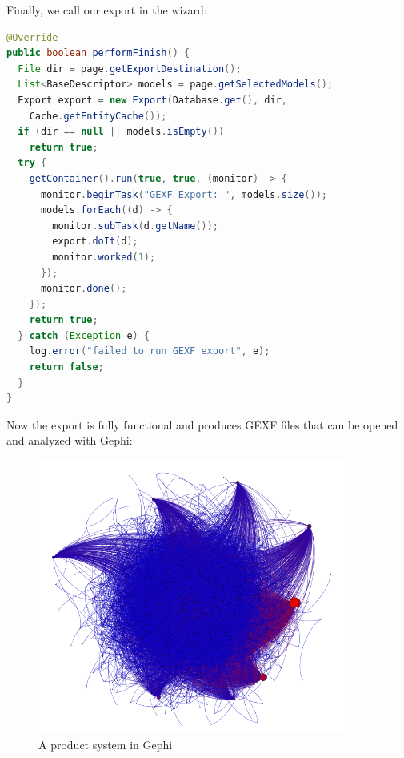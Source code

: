 \documentclass{scrreprt}
\begin{document}
Finally, we call our export in the wizard:

\begin{lstlisting}[language=Java]
@Override
public boolean performFinish() {
  File dir = page.getExportDestination();
  List<BaseDescriptor> models = page.getSelectedModels();
  Export export = new Export(Database.get(), dir,
    Cache.getEntityCache());
  if (dir == null || models.isEmpty())
    return true;
  try {
    getContainer().run(true, true, (monitor) -> {
      monitor.beginTask("GEXF Export: ", models.size());
      models.forEach((d) -> {
        monitor.subTask(d.getName());
        export.doIt(d);
        monitor.worked(1);
      });
      monitor.done();
    });
    return true;
  } catch (Exception e) {
    log.error("failed to run GEXF export", e);
    return false;
  }
}
\end{lstlisting}

Now the export is fully functional and produces GEXF files that can be opened and analyzed with Gephi:

\begin{figure}[H]
\centering
\includegraphics[width=0.9\textwidth]{images/plugin_result.png}
\caption{A product system in Gephi}
\end{figure}  
\end{document}
